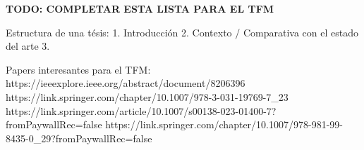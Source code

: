 \textbf{TODO: COMPLETAR ESTA LISTA PARA EL TFM}

Estructura de una tésis:
1. Introducción
2. Contexto / Comparativa con el estado del arte
3. 



Papers interesantes para el TFM:
https://ieeexplore.ieee.org/abstract/document/8206396
https://link.springer.com/chapter/10.1007/978-3-031-19769-7_23
https://link.springer.com/article/10.1007/s00138-023-01400-7?fromPaywallRec=false
https://link.springer.com/chapter/10.1007/978-981-99-8435-0_29?fromPaywallRec=false





